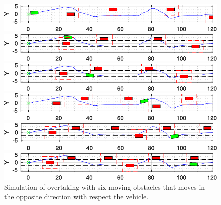 \begin{figure}[h!]
	\centering
	\begin{minipage}[t]{\textwidth}
		\includegraphics[width=\textwidth]{../figure/6_obstacles/6_obstacles_1.pdf}
	\end{minipage}
	\begin{minipage}[t]{\textwidth}
		\includegraphics[width=\textwidth]{../figure/6_obstacles/6_obstacles_2.pdf}
	\end{minipage}
	\begin{minipage}[t]{\textwidth}
		\includegraphics[width=\textwidth]{../figure/6_obstacles/6_obstacles_3.pdf}
	\end{minipage}
	\begin{minipage}[t]{\textwidth}
		\includegraphics[width=\textwidth]{../figure/6_obstacles/6_obstacles_4.pdf}
	\end{minipage}
	\begin{minipage}[t]{\textwidth}
		\includegraphics[width=\textwidth]{../figure/6_obstacles/6_obstacles_5.pdf}
	\end{minipage}
	\begin{minipage}[t]{\textwidth}
		\includegraphics[width=\textwidth]{../figure/6_obstacles/6_obstacles_6.pdf}
	\end{minipage}
	\caption{Simulation of overtaking with six moving obstacles that moves in the opposite direction with respect the vehicle.}
	\label{fig:obstacleAvoidance_six_obstacles}
\end{figure}

